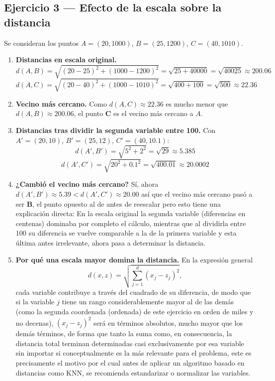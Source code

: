 \subsection{Ejercicio 3 --- Efecto de la escala sobre la distancia}

Se consideran los puntos $A=(20,1000)$, $B=(25,1200)$, $C=(40,1010)$.

\begin{enumerate}

\item \textbf{Distancias en escala original.}
\[
    d(A,B) = \sqrt{(20-25)^2+(1000-1200)^2} = \sqrt{25+40000} = \sqrt{40025} \approx 200.06
\]
\[
    d(A,C) = \sqrt{(20-40)^2+(1000-1010)^2} = \sqrt{400+100} = \sqrt{500} \approx 22.36
\]

\item \textbf{Vecino más cercano.}
Como $d(A,C)\approx 22.36$ es mucho menor que $d(A,B)\approx 200.06$,
el punto \textbf{C} es el vecino más cercano a $A$.

\item \textbf{Distancias tras dividir la segunda variable entre 100.}
Con $A'=(20,10)$, $B'=(25,12)$, $C'=(40,10.1)$:
\[
    d(A',B') = \sqrt{5^2+2^2} = \sqrt{29} \approx 5.385
\]
\[
    d(A',C') = \sqrt{20^2+0.1^2} = \sqrt{400.01} \approx 20.0002
\]

\item \textbf{¿Cambió el vecino más cercano?}
Sí, ahora $d(A',B')\approx 5.39 < d(A',C')\approx 20.00$ así que el
vecino más cercano pasó a ser \textbf{B}, el punto opuesto al de antes
de reescalar pero esto tiene una explicación directa: En la escala
original la segunda variable (diferencias en centenas) dominaba por
completo el cálculo, mientras que al dividirla entre 100 su diferencia
se vuelve comparable a la de la primera variable y esta última antes
irrelevante, ahora pasa a determinar la distancia.

\item \textbf{Por qué una escala mayor domina la distancia.}
En la expresión general
\[
    d(x,z) = \sqrt{\sum_{j=1}^{d} (x_j-z_j)^2},
\]
cada variable contribuye a través del cuadrado de su diferencia, de
modo que si la variable $j$ tiene un rango considerablemente mayor al
de las demás (como la segunda coordenada (ordenada) de este ejercicio en orden de miles y no decenas), $(x_j-z_j)^2$ será en términos absolutos,
mucho mayor que los demás términos, de forma que tanto la suma como,
en consecuencia, la distancia total terminan determinadas casi
exclusivamente por esa variable sin importar si conceptualmente es la
más relevante para el problema, este es precisamente el motivo por
el cual antes de aplicar un algoritmo basado en distancias como KNN,
se recomienda estandarizar o normalizar las variables.

\end{enumerate}

